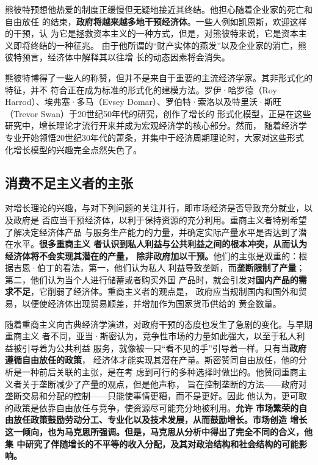 熊彼特预想他热爱的制度正缓慢但无疑地接近其终结。他担心随着企业家的死亡和自由放任
的结束，\textbf{政府将越来越多地干预经济体}。一些人例如凯恩斯，欢迎这样的干预，认
为它是拯救资本主义的一种方式，但是，对熊彼特来说，它是资本主义即将终结的一种征兆。
由于他所谓的“财产实体的燕发”以及企业家的消亡，熊彼特预言，经济体中解释其以往增
长的动态因素将会消失。

熊彼特博得了一些人的称赞，但并不是来自于重要的主流经济学家。其非形式化的特征，并不
符合正在成为标准的形式化的建模方法。罗伊·哈罗德（Roy Harrod）、埃弗塞·多马（Evsey
Domar）、罗伯特·索洛以及特里沃·斯旺（Trevor Swan）于20世纪50年代的研究，创作了增长的
形式化模型，正是在这些研究中，增长理论才流行开来并成为宏观经济学的核心部分。然而，
随着经济学专业开始领悟20世纪30年代的萧条，并集中于经济周期理论时，大家对这些形式
化增长模型的兴趣完全点然失色了。

\subsection{消费不足主义者的主张}

对增长理论的兴趣，与对下列问题的关注并行，即市场经济是否导致充分就业，以及政府是
否应当干预经济体，以利于保持资源的充分利用。重商主义者特别希望了解决定经济体产品
与服务生产能力的力量，并确定实际产量水平是否达到了潜在水平。\textbf{很多重商主义
  者认识到私人利益与公共利益之间的根本冲突，从而认为经济体将不会实现其潜在的产量，
  除非政府加以干预。}他们的主张是双重的：根据吉恩·伯丁的看法，第一，他们认为私人
利益导致垄断，而\textbf{垄断限制了产量}；第二，他们认为当个人进行储蓄或者购买外国
产品时，就会引发对\textbf{国内产品的需求不足}，它削弱了经济体。重商主义者的观点是，
政府应当规制国内和国外和贸易，以便使经济体出现贸易顺差，并增加作为国家货币供给的
黄金数量。

随着重商主义向古典经济学演进，对政府干预的态度也发生了急剧的变化。与早期重商主义
者不同，亚当·斯密认为，竞争性市场的力量如此强大，以至于私人利益被引导着为公共利益
服务，就像被一只“看不见的手”引导着一样。只有当\textbf{政府遵循自由放任的政策}，
经济体才能实现其潜在产量。斯密赞同自由放任，他的分析是一种前后关联的主张，是在考
虑到可行的多种选择时做出的。他赞同重商主义者关于垄断减少了产量的观点，但是他声称，
旨在控制垄断的方法——政府对垄断交易和分配的控制——只能使事情更糟，而不是更好。因此
他认为，更可取的政策是依靠自由放任与竞争，使资源尽可能充分地被利用。\textbf{允许
  市场繁荣的自由放任政策鼓励劳动分工、专业化以及技术发展，从而鼓励增长。市场创造
  增长这一倾向，也为马克思所强调。但是，马克思从分析中得出了完全不同的合义，他集
  中研究了伴随增长的不平等的收入分配，及其对政治结构和社会结构的可能影响。}

